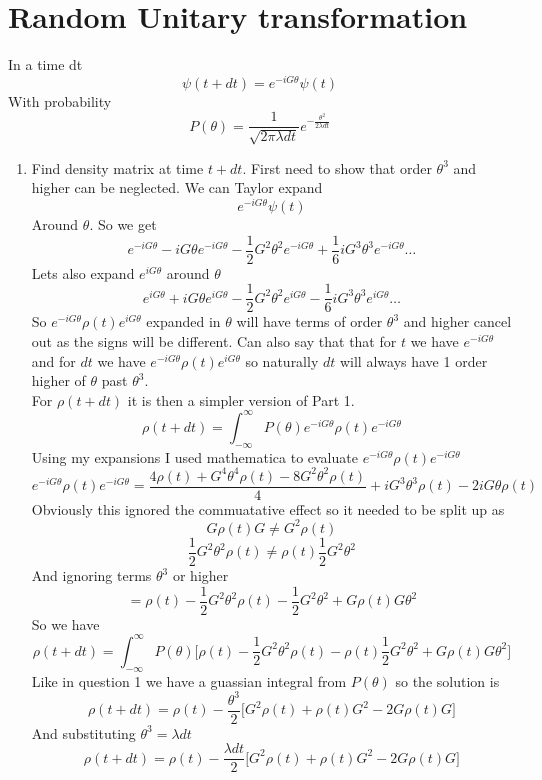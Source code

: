\documentclass[12pt]{article}
\begin{document}
\begin{enumerate}
\end{enumerate}

\section{Random Unitary transformation} 
In a time dt 
$$ \psi (t +dt ) = e^{-iG \theta} \psi (t) $$
With probability 
$$ P(\theta) = \frac{1}{\sqrt{2 \pi \lambda dt}} e^{-\frac{\theta^2}{2 \lambda dt}} $$
\begin{enumerate}
    \item Find density matrix at time $t +dt $. First need to show that order $\theta^3$ and higher can be neglected. We can Taylor expand 
    $$ e^{-iG \theta} \psi(t) $$ 
    Around $\theta$. So we get 
    $$ e^{-iG \theta} - iG \theta e^{-i G \theta} - \frac{1}{2} G^2 \theta^2 e^{-iG \theta} + \frac{1}{6} iG^3 \theta^3 e^{-iG \theta} \ldots $$
    Lets also expand $e^{iG \theta}$ around $\theta$ 
    $$ e^{iG \theta} + iG \theta e^{iG \theta} - \frac{1}{2} G^2 \theta^2 e^{iG \theta} - \frac{1}{6} i G^3 \theta^3 e^{iG \theta} \ldots $$
    So $e^{-iG \theta} \rho (t) e^{iG \theta} $ expanded in $\theta$ will have terms of order $\theta^3$ and higher cancel out as the signs will be different. Can also say that that for $t$ we have $e^{-i G \theta}$ and for $dt$ we have $ e^{-iG \theta} \rho (t) e^{iG \theta}$ so naturally $dt$ will always have 1 order higher of $\theta$ past $\theta^3$. 
    \\
    For $\rho (t+dt)$ it is then a simpler version of Part 1.
    $$ \rho (t + dt ) = \int_{-\infty}^{\infty} P(\theta) e^{-iG \theta} \rho (t) e^{-iG \theta} $$ 
    Using my expansions I used mathematica to evaluate $e^{-iG \theta} \rho (t) e^{-iG \theta}$
    $$ e^{-iG \theta} \rho (t) e^{-iG \theta} = \frac{4 \rho(t) + G^4 \theta^4 \rho(t) -8 G^2 \theta^2 \rho(t)}{4} + iG^3 \theta^3 \rho (t) - 2iG \theta \rho (t) $$
    Obviously this ignored the commuatative effect so it needed to be split up as 
    $$ G \rho (t) G \neq G^2 \rho (t) $$
    $$ \frac{1}{2} G^2 \theta^2 \rho (t) \neq \rho (t) \frac{1}{2} G^2 \theta^2 $$
    And ignoring terms $\theta^3$ or higher 
    $$ = \rho (t) - \frac{1}{2} G^2 \theta^2 \rho (t) - \frac{1}{2}G^2 \theta^2 + G \rho (t) G \theta^2 $$
    So we have 
    $$ \rho (t + dt) = \int_{-\infty}^{\infty} P(\theta) \Big[ \rho (t) - \frac{1}{2} G^2 \theta^2 \rho (t) - \rho (t) \frac{1}{2} G^2 \theta^2 + G \rho (t) G \theta^2] $$
    Like in question 1 we have a guassian integral from $P(\theta)$ so the solution is 
    $$ \rho (t + dt) = \rho (t) - \frac{\theta^3}{2} \Big[ G^2 \rho(t) + \rho (t) G^2 - 2G \rho (t) G \Big] $$
    And substituting $\theta^3 = \lambda dt$ 
    $$ \rho (t +dt ) = \rho (t) - \frac{\lambda dt}{2} \Big[ G^2 \rho (t) + \rho (t) G^2 - 2G \rho (t) G \Big] $$


\end{enumerate}
\end{document}
